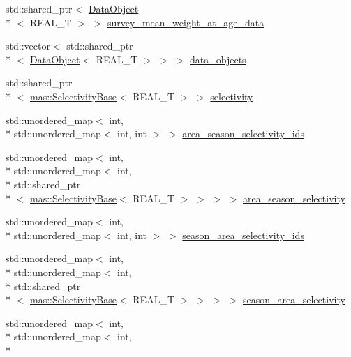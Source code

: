 \begin{DoxyCompactItemize}
\item 
std\-::shared\-\_\-ptr$<$ \hyperlink{structmas_1_1_data_object}{Data\-Object}\\*
$<$ R\-E\-A\-L\-\_\-\-T $>$ $>$ \hyperlink{structmas_1_1_survey_ad01d8e1c386d36f34c352238f78f4ead}{survey\-\_\-mean\-\_\-weight\-\_\-at\-\_\-age\-\_\-data}
\item 
std\-::vector$<$ std\-::shared\-\_\-ptr\\*
$<$ \hyperlink{structmas_1_1_data_object}{Data\-Object}$<$ R\-E\-A\-L\-\_\-\-T $>$ $>$ $>$ \hyperlink{structmas_1_1_survey_a2dd1a625771db3a41ed2a050a984beeb}{data\-\_\-objects}
\item 
std\-::shared\-\_\-ptr\\*
$<$ \hyperlink{structmas_1_1_selectivity_base}{mas\-::\-Selectivity\-Base}$<$ R\-E\-A\-L\-\_\-\-T $>$ $>$ \hyperlink{structmas_1_1_survey_a798139029887e8727481a8f76b261ee0}{selectivity}
\item 
std\-::unordered\-\_\-map$<$ int, \\*
std\-::unordered\-\_\-map$<$ int, int $>$ $>$ \hyperlink{structmas_1_1_survey_a0b41369965fde2f49c1511a38a60447a}{area\-\_\-season\-\_\-selectivity\-\_\-ids}
\item 
std\-::unordered\-\_\-map$<$ int, \\*
std\-::unordered\-\_\-map$<$ int, \\*
std\-::shared\-\_\-ptr\\*
$<$ \hyperlink{structmas_1_1_selectivity_base}{mas\-::\-Selectivity\-Base}$<$ R\-E\-A\-L\-\_\-\-T $>$ $>$ $>$ $>$ \hyperlink{structmas_1_1_survey_af401401f9a2b3e9ca1e37a94f04db0c4}{area\-\_\-season\-\_\-selectivity}
\item 
std\-::unordered\-\_\-map$<$ int, \\*
std\-::unordered\-\_\-map$<$ int, int $>$ $>$ \hyperlink{structmas_1_1_survey_ad34128c8609aa9f7a2d37e8f484bb70b}{season\-\_\-area\-\_\-selectivity\-\_\-ids}
\item 
std\-::unordered\-\_\-map$<$ int, \\*
std\-::unordered\-\_\-map$<$ int, \\*
std\-::shared\-\_\-ptr\\*
$<$ \hyperlink{structmas_1_1_selectivity_base}{mas\-::\-Selectivity\-Base}$<$ R\-E\-A\-L\-\_\-\-T $>$ $>$ $>$ $>$ \hyperlink{structmas_1_1_survey_a7c006caaf702a6288b3c6ff2407af3b1}{season\-\_\-area\-\_\-selectivity}
\item 
std\-::unordered\-\_\-map$<$ int, \\*
std\-::unordered\-\_\-map$<$ int, \\*

\end{DoxyCompactItemize}
